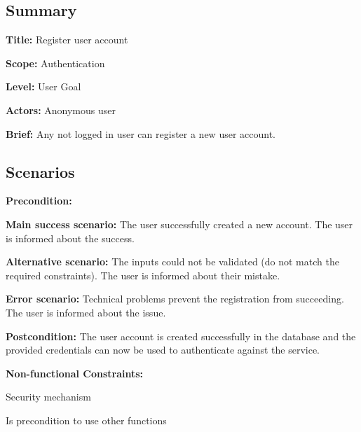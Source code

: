 \subsection*{Summary}


\begin{DoxyItemize}
\item {\bfseries Title\+:} Register user account
\item {\bfseries Scope\+:} Authentication
\item {\bfseries Level\+:} User Goal
\item {\bfseries Actors\+:} Anonymous user
\item {\bfseries Brief\+:} Any not logged in user can register a new user account.
\end{DoxyItemize}

\subsection*{Scenarios}


\begin{DoxyItemize}
\item {\bfseries Precondition\+:}
\item {\bfseries Main success scenario\+:} The user successfully created a new account. The user is informed about the success.
\item {\bfseries Alternative scenario\+:} The inputs could not be validated (do not match the required constraints). The user is informed about their mistake.
\item {\bfseries Error scenario\+:} Technical problems prevent the registration from succeeding. The user is informed about the issue.
\item {\bfseries Postcondition\+:} The user account is created successfully in the database and the provided credentials can now be used to authenticate against the service.
\item {\bfseries Non-\/functional Constraints\+:}
\begin{DoxyItemize}
\item Security mechanism
\item Is precondition to use other functions 
\end{DoxyItemize}
\end{DoxyItemize}